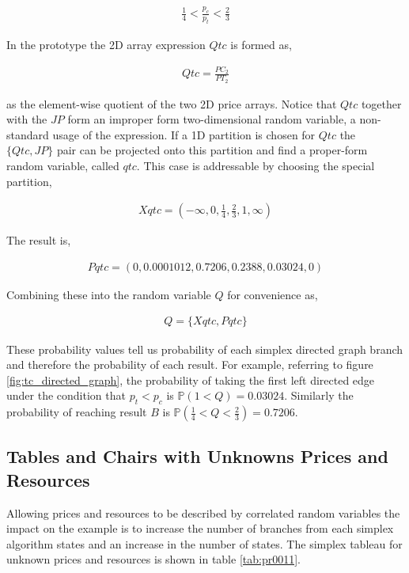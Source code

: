 \begin{align*}
\frac{1}{4} < \frac{p_c}{p_t} < \frac{2}{3}
\end{align*}

In the prototype the 2D array expression $Qtc$ is formed as,

\begin{align*}
Qtc = \frac{PC_2}{PT_2}
\end{align*}

as the element-wise quotient of the two 2D price arrays. Notice that $Qtc$ together with the $JP$ form an improper form two-dimensional random variable, a non-standard usage of the expression. If a 1D partition is chosen for $Qtc$ the $\{Qtc, JP\}$ pair can be projected onto this partition and find a proper-form random variable, called $qtc$. This case is addressable by choosing the special partition,

\begin{align*}
Xqtc = (-\infty, 0, \frac{1}{4}, \frac{2}{3}, 1, \infty)
\end{align*}

The result is,

\begin{align*}
Pqtc = (0, 0.0001012, 0.7206, 0.2388, 0.03024, 0)
\end{align*}

Combining these into the random variable $Q$ for convenience as,

\begin{align*}
Q = \{Xqtc, Pqtc\}
\end{align*}

These probability values tell us probability of each simplex directed graph branch and therefore the probability of each result. For example, referring to figure \ref{fig:tc_directed_graph}, the probability of taking the first left directed edge under the condition that $p_t < p_c$ is  $\mathbb{P}(1 < Q) = 0.03024$. Similarly the probability of reaching result $B$ is $\mathbb{P}(\frac{1}{4} < Q < \frac{2}{3}) = 0.7206$.

\subsection{Tables and Chairs with Unknowns Prices and Resources}

Allowing prices and resources to be described by correlated random variables the impact on the example is to increase the number of branches from each simplex algorithm states and an increase in the number of states. The simplex tableau for unknown prices and resources is shown in table \ref{tab:pr0011}. 


